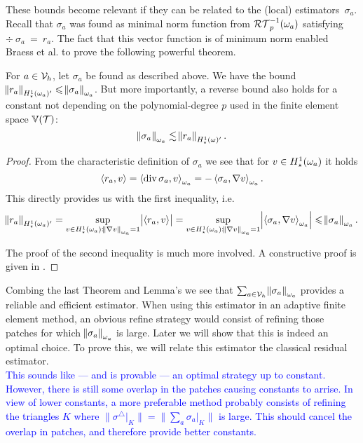 \documentclass[thesis.tex]{subfiles}
\begin{document}
These bounds become relevant if they can be related to the (local) estimators~$\sigma_a$. Recall
that $\sigma_a$ was found as minimal norm function from $\mathcal{RT}_p^{-1}(\omega_a)$ satisfying $\div~\sigma_a~=~r_a$.
The fact that this vector function is of minimum norm enabled Braess et al. \cite{braessequilrobust} to prove the following powerful theorem.
\begin{thm}
  \label{thm:locresequiv}
  For $a \in \mathcal{V}_h$, let $\sigma_a$ be found as described above. 
  We have the bound $\norm{r_a}_{H_\star^1(\omega_a)'} \leqslant \norm{\sigma_a}_{\omega_a}$. But more importantly,
  a reverse bound also holds for a constant {not} depending on the polynomial-degree $p$ used in the finite element space $\mathbb{V}(\mathcal{T})$:
  \[
    \norm{\sigma_a}_{\omega_a} \lesssim \norm{r_a}_{H_\star^1(\omega)'}.
  \]
\end{thm}
\begin{proof}
  From the characteristic definition of $\sigma_a$ we see that for $v \in H_\star^1(\omega_a)$ it holds
  \[
    \left \langle r_a, v \right \rangle = \left \langle \operatorname{div} \sigma_a, v \right \rangle_{\omega_a} = - \left \langle \sigma_a, \nabla v \right \rangle_{\omega_a}.
  \]
  This directly provides us with the first inequality, i.e.
  \[
    \norm{r_a}_{H_\star^1(\omega_a)'} = \sup_{v \in H_\star^1(\omega_a) : \norm{\nabla v}_{\omega_a} = 1} \abs{\left \langle r_a, v \right \rangle} = \sup_{v \in H_\star^1(\omega_a) : \norm{\nabla v}_{\omega_a}=1} \abs{\left \langle \sigma_a, \nabla v \right \rangle_{\omega_a}} \leqslant \norm{\sigma_a}_{\omega_a}.
  \]

  The proof of the second inequality is much more involved. A constructive proof is given in \cite[Theorem~7]{braessequilrobust}.
\end{proof}
\begin{rem}
  Combing the last Theorem and Lemma's we see that $\sum_{a \in \mathcal{V}_h} \norm{\sigma_a}_{\omega_a}$ provides a reliable and efficient estimator.
  When using this estimator in an adaptive finite element method, an obvious refine strategy would consist
  of refining those patches for which $\norm{\sigma_a}_{\omega_a}$ is large. Later we will show that this is indeed
  an optimal choice. To prove this, we will relate this estimator the classical residual estimator.
  \\
  \textcolor{blue}{
    This sounds like --- and is provable --- an optimal strategy up to constant. However, there is still some 
    overlap in the patches causing constants to arrise. In view of lower constants, a more preferable method probably consists of refining the triangles $K$
    where $\|{\sigma^\triangle|_{K}}\| =\|{\sum_{a} \sigma_a|_{K}}\|$ is large. This should cancel the overlap in patches,
    and therefore provide better constants.
  }
\end{rem}
\end{document}
